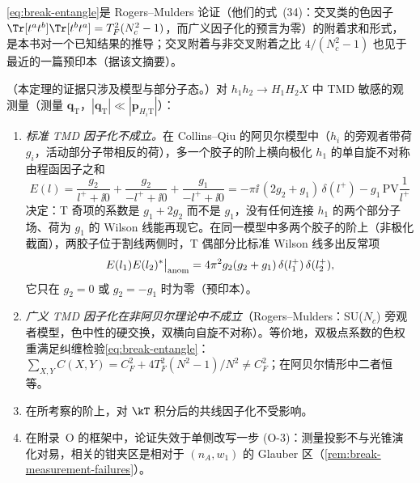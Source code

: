\cref{eq:break-entangle}是 Rogers--Mulders 论证（他们的式~(34)：交叉类的色因子 $\Tr[t^at^b]\Tr[t^bt^a]=T_F^2(N_c^2-1)$，而广义因子化的预言为零）的附着求和形式，是本书对一个已知结果的推导；交叉附着与非交叉附着之比 $4/(N_c^2-1)$ 也见于最近的一篇预印本\cite{Zhou:2026ids}（据该文摘要）。

\begin{theorem}\label{thm:break-tmd}
（本定理的证据只涉及模型与部分子态。）对 $h_1h_2\to H_1H_2X$ 中 TMD 敏感的观测量（测量 $\boldsymbol q_{\mathrm T}$，$|\boldsymbol q_{\mathrm T}|\ll|\boldsymbol p_{H_i\mathrm T}|$）：
\begin{enumerate}[label=(\alph*),leftmargin=2.2em,itemsep=1pt,topsep=2pt]
\item \emph{标准 TMD 因子化不成立。}在 Collins--Qiu 的阿贝尔模型中（$h_i$ 的旁观者带荷 $g_i$，活动部分子带相反的荷），多一个胶子的阶上横向极化 $h_1$ 的单自旋不对称由程函因子之和
\begin{equation}\label{eq:break-El}
E(l)=\frac{g_2}{l^++\ii0}+\frac{g_2}{-l^++\ii0}+\frac{g_1}{-l^++\ii0}=-\pi\ii\,(2g_2+g_1)\,\delta(l^+)-g_1\,\mathrm{PV}\frac1{l^+}
\end{equation}
决定：T 奇项的系数是 $g_1+2g_2$ 而不是 $g_1$，没有任何连接 $h_1$ 的两个部分子场、荷为 $g_1$ 的 Wilson 线能再现它\cite{CollinsQiu2007}。在同一模型中多两个胶子的阶上（非极化截面），两胶子位于割线两侧时，T 偶部分比标准 Wilson 线多出反常项
\begin{equation}\label{eq:break-anomaly}
E(l_1)E(l_2)^*\big|_{\rm anom}=4\pi^2g_2(g_2+g_1)\,\delta(l_1^+)\,\delta(l_2^+),
\end{equation}
它只在 $g_2=0$ 或 $g_2=-g_1$ 时为零\cite{Collins2007}（预印本）。
\item \emph{广义 TMD 因子化在非阿贝尔理论中不成立}（Rogers--Mulders：SU($N_c$) 旁观者模型，色中性的硬交换，双横向自旋不对称\cite{RogersMulders2010}）。等价地，双极点系数的色权重满足纠缠检验\cref{eq:break-entangle}：$\sum_{X,Y}C(X,Y)=C_F^2+4T_F^2(N^2-1)/N^2\neq C_F^2$；在阿贝尔情形中二者恒等。
\item 在所考察的阶上，对 $\kT$ 积分后的共线因子化不受影响\cite{Collins2007}。
\item 在附录~O 的框架中，论证失效于单侧改写一步 (O-3)：测量投影不与光锥演化对易，相关的钳夹区是相对于 $(n_A,w_1)$ 的 Glauber 区（\cref{rem:break-measurement-failures}）。
\end{enumerate}
\end{theorem}

